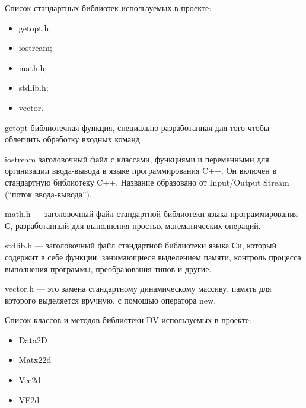 Список стандартных библиотек используемых в проекте:

\begin{itemize}
\item getopt.h;
\item iostream;
\item math.h;
\item stdlib.h;
\item vector.
\end{itemize}

getopt библиотечная функция, специально разработанная для того чтобы облегчить обработку входных команд. 

iostream заголовочный файл с классами, функциями и переменными для организации ввода-вывода в языке программирования C++. Он включён в стандартную библиотеку C++. Название образовано от Input/Output Stream (``поток ввода-вывода'').

math.h — заголовочный файл стандартной библиотеки языка программирования С, разработанный для выполнения простых математических операций.

stdlib.h — заголовочный файл стандартной библиотеки языка Си, который содержит в себе функции, занимающиеся выделением памяти, контроль процесса выполнения программы, преобразования типов и другие.

vector.h — это замена стандартному динамическому массиву, память для которого выделяется вручную, с помощью оператора new.

Список классов и методов библиотеки DV используемых в проекте:
\begin{itemize}
\item Data2D
\item Matx22d
\item Vec2d
\item VF2d
\end{itemize}